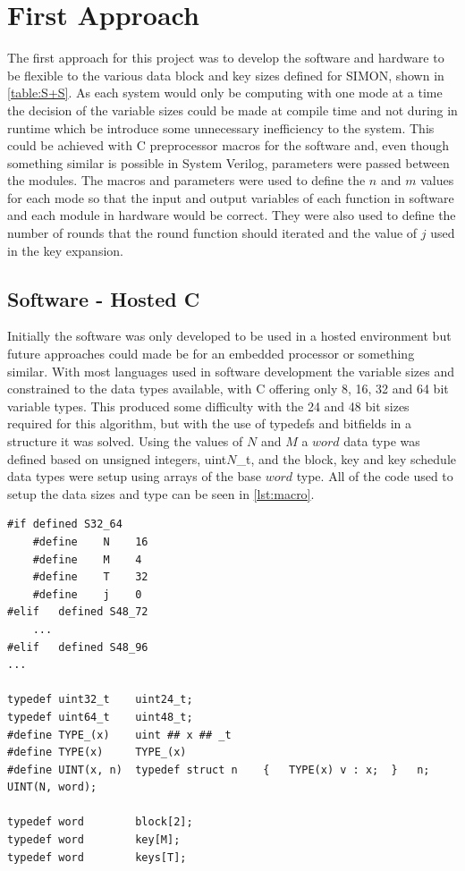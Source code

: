 \documentclass[12pt,twoside,a4paper]{report}
\begin{document}
	\section{First Approach}
	\label{section:first}
	The first approach for this project was to develop the software and hardware to be flexible to the various data block and key sizes defined for SIMON, shown in \autoref{table:S+S}. As each system would only be computing with one mode at a time the decision of the variable sizes could be made at compile time and not during in runtime which be introduce some unnecessary inefficiency to the system. This could be achieved with C preprocessor macros for the software and, even though something similar is possible in System Verilog, parameters were passed between the modules. The macros and parameters were used to define the $n$ and $m$ values for each mode so that the input and output variables of each function in software and each module in hardware would be correct. They were also used to define the number of rounds that the round function should iterated and the value of $j$ used in the key expansion.
    
	\subsection{Software - Hosted C}
	\label{subsection:HOSTED1}
	Initially the software was only developed to be used in a hosted environment but future approaches could made be for an embedded processor or something similar. With most languages used in software development the variable sizes and constrained to the data types available, with C offering only 8, 16, 32 and 64 bit variable types. This produced some difficulty with the 24 and 48 bit sizes required for this algorithm, but with the use of typedefs and bitfields in a structure it was solved. Using the values of $N$ and $M$ a $word$ data type was defined based on unsigned integers, uint$N$\_t, and the block, key and key schedule data types were setup using arrays of the base $word$ type. All of the code used to setup the data sizes and type can be seen in \autoref{lst:macro}.
    
	\begin{lstlisting}[label={lst:macro},caption={Macro definition of the word, block, key and key schedule types.},style=CStyle]
#if	defined	S32_64
    #define    N    16
    #define    M    4
    #define    T    32
    #define    j    0
#elif	defined S48_72
    ...
#elif	defined S48_96
...

typedef uint32_t	uint24_t;
typedef uint64_t	uint48_t;
#define TYPE_(x)	uint ## x ## _t
#define TYPE(x)		TYPE_(x)
#define UINT(x, n)	typedef struct n	{	TYPE(x) v : x;	}	n;
UINT(N, word);

typedef word 		block[2];
typedef word 		key[M];
typedef word		keys[T];
	\end{lstlisting}
    
\end{document}
